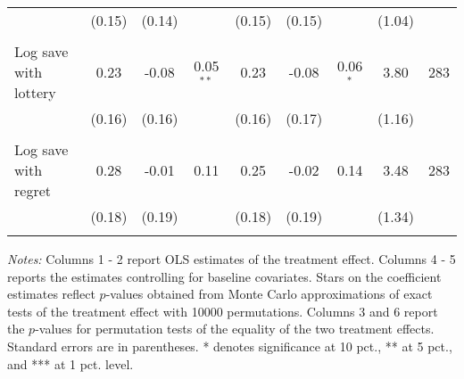\begin{table}[htbp]
{\begin{threeparttable}
\begin{tabular}{l*{8}{c}}
          &   (0.15)&   (0.14)&         &   (0.15)&   (0.15)&         &   (1.04)&         \\
          &         &         &         &         &         &         &         &         \\
Log save with lottery&     0.23&    -0.08&0.05$^{**}$&     0.23&    -0.08&0.06$^{*}$&     3.80&      283\\
          &   (0.16)&   (0.16)&         &   (0.16)&   (0.17)&         &   (1.16)&         \\
          &         &         &         &         &         &         &         &         \\
Log save with regret&     0.28&    -0.01&     0.11&     0.25&    -0.02&     0.14&     3.48&      283\\
          &   (0.18)&   (0.19)&         &   (0.18)&   (0.19)&         &   (1.34)&         \\
          &         &         &         &         &         &         &         &         \\
\bottomrule \end{tabular} \begin{tablenotes}[flushleft] \footnotesize \item \emph{Notes:} Columns 1 - 2 report OLS estimates of the treatment effect. Columns 4 - 5 reports the estimates controlling for baseline covariates. Stars on the coefficient estimates reflect \(p\)-values obtained from Monte Carlo approximations of exact tests of the treatment effect with 10000 permutations. Columns 3 and 6 report the \(p\)-values for permutation tests of the equality of the two treatment effects. Standard errors are in parentheses. * denotes significance at 10 pct., ** at 5 pct., and *** at 1 pct. level. \end{tablenotes} \end{threeparttable} } \end{table}

